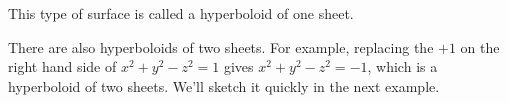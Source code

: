 \begin{eg}[$4x^2+y^2-z^2=1$]
\begin{efig}
\begin{center}
\end{center}
\end{efig}
This type of surface is called a hyperboloid of one sheet.

There are also hyperboloids of two sheets. For example, replacing the $+1$
on the right hand side of $x^2+y^2-z^2=1$ gives $x^2+y^2-z^2=-1$, which is
a hyperboloid of two sheets. We'll sketch it quickly in the next example. 
\end{eg}

